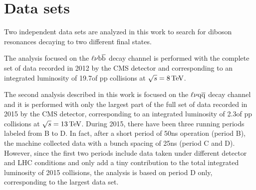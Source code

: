 
\section{Data sets}\label{sec:data set}

Two independent data sets are analyzed in this work to search for diboson resonances decaying to two different final states.

The analysis focused on the $\ell\nu{\mathrm{b}\overline{\mathrm{b}}}$ decay channel is performed with the complete set of data recorded in 2012 by the CMS detector
and corresponding to an integrated luminosity of 19.7\fbinv of pp collisions at $\sqrt{s} = 8\,\text{Te\hspace{-.08em}V}$.

The second analysis described in this work is focused on the $\ell\nu\mathrm{q}\overline{\mathrm{q}}$ decay channel and it is performed with only the largest part of the full set of data recorded in 2015 by the CMS detector,
corresponding to an integrated luminosity of 2.3\fbinv of pp collisions at $\sqrt{s} = 13\,\text{Te\hspace{-.08em}V}$.
During 2015, there have been three running periods labeled from B to D. In fact, after a short period of 50\unit{ns} operation (period B), the machine collected data with a bunch spacing of 25\unit{ns} (period C and D).
However, since the first two periods include data taken under different detector and LHC conditions and only add a tiny contribution to the total integrated luminosity of 2015 collisions, the analysis is based on period D only, corresponding to the largest data set.

